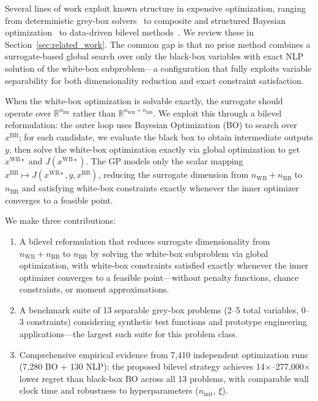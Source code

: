 \documentclass[12pt,a4paper]{article}%
\theoremstyle{plain}%
\theoremstyle{remark}%
\theoremstyle{definition}%
\def\WB{\mathrm{WB}}
\def\BB{\mathrm{BB}}
\begin{document}
Several lines of work exploit known structure in expensive optimization, ranging from deterministic grey-box solvers~\cite{boukouvala2017greybox_jgo,boukouvala2017argonaut,eason2016trf} to composite and structured Bayesian optimization~\cite{astudillo2019bocf,paulson2022cobalt,kudva2025bonsai} to data-driven bilevel methods~\cite{beykal2020domino,kieffer2017bilevel}. We review these in Section~\ref{sec:related_work}. The common gap is that no prior method combines a surrogate-based global search over only the black-box variables with exact NLP solution of the white-box subproblem---a configuration that fully exploits variable separability for both dimensionality reduction and exact constraint satisfaction.

When the white-box optimization is solvable exactly, the surrogate should operate over $\mathbb{R}^{n_{\BB}}$ rather than $\mathbb{R}^{n_{\WB}+n_{\BB}}$. We exploit this through a bilevel reformulation: the outer loop uses Bayesian Optimization (BO) to search over $x^{\BB}$; for each candidate, we evaluate the black box to obtain intermediate outputs $y$, then solve the white-box optimization exactly via global optimization to get $x^{\WB\star}$ and $J(x^{\WB\star})$. The GP models only the scalar mapping $x^{\BB} \mapsto J(x^{\WB\star}, y, x^{\BB})$, reducing the surrogate dimension from $n_{\WB}+n_{\BB}$ to $n_{\BB}$ and satisfying white-box constraints exactly whenever the inner optimizer converges to a feasible point.

We make three contributions:
\begin{enumerate}
    \item A bilevel reformulation that reduces surrogate dimensionality from $n_{\WB}+n_{\BB}$ to $n_{\BB}$ by solving the white-box subproblem via global optimization, with white-box constraints satisfied exactly whenever the inner optimizer converges to a feasible point---without penalty functions, chance constraints, or moment approximations.
    \item A benchmark suite of 13 separable grey-box problems (2--5 total variables, 0--3 constraints) considering synthetic test functions and prototype engineering applications---the largest such suite for this problem class.
    \item Comprehensive empirical evidence from 7{,}410 independent optimization runs (7{,}280 BO + 130 NLP): the proposed bilevel strategy achieves 14$\times$--277{,}000$\times$ lower regret than black-box BO across all 13 problems, with comparable wall clock time and robustness to hyperparameters ($n_\text{init}$, $\xi$).
\end{enumerate}
\end{document}
